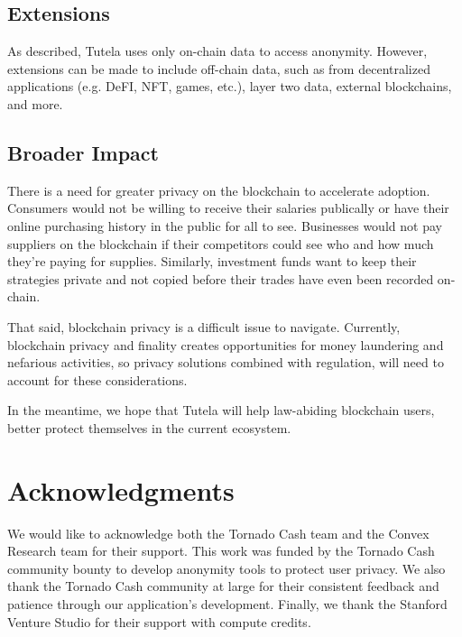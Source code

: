 \documentclass[11pt,a4paper]{article}
\begin{document}
\subsection{Extensions}

As described, Tutela uses only on-chain data to access anonymity. However, extensions can be made to include off-chain data, such as from decentralized applications (e.g. DeFI, NFT, games, etc.), layer two data, external blockchains, and more.

\subsection{Broader Impact}

There is a need for greater privacy on the blockchain to accelerate adoption. Consumers would not be willing to receive their salaries publically or have their online purchasing history in the public for all to see. Businesses would not pay suppliers on the blockchain if their competitors could see who and how much they're paying for supplies. Similarly, investment funds want to keep their strategies private and not copied before their trades have even been recorded on-chain.

That said, blockchain privacy is a difficult issue to navigate. Currently, blockchain privacy and finality creates opportunities for money laundering and nefarious activities, so privacy solutions combined with regulation, will need to account for these considerations.

In the meantime, we hope that Tutela will help law-abiding blockchain users, better protect themselves in the current ecosystem. 

\section*{Acknowledgments}
We would like to acknowledge both the Tornado Cash team and the Convex Research team for their support. This work was funded by the Tornado Cash community bounty to develop anonymity tools to protect user privacy. We also thank the Tornado Cash community at large for their consistent feedback and patience through our application's development. Finally, we thank the Stanford Venture Studio for their support with compute credits.



\end{document}
